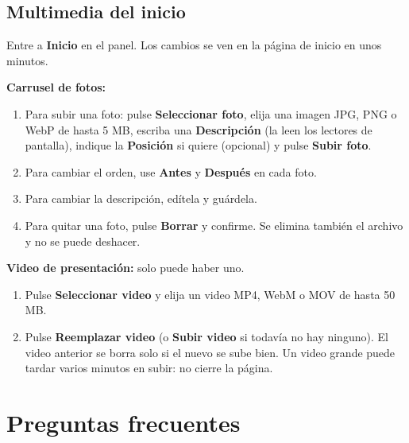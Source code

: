 \documentclass[11pt,a4paper]{article}
\newcommand{\boton}[1]{\textbf{\textcolor{siiisazul}{#1}}}
\begin{document}

\subsection{Multimedia del inicio}
Entre a \boton{Inicio} en el panel. Los cambios se ven en la p\'agina de inicio en unos minutos.

\textbf{Carrusel de fotos:}
\begin{enumerate}
  \item Para subir una foto: pulse \boton{Seleccionar foto}, elija una imagen JPG, PNG o WebP de hasta 5 MB, escriba
    una \textbf{Descripci\'on} (la leen los lectores de pantalla), indique la \textbf{Posici\'on} si quiere (opcional)
    y pulse \boton{Subir foto}.
  \item Para cambiar el orden, use \boton{Antes} y \boton{Despu\'es} en cada foto.
  \item Para cambiar la descripci\'on, ed\'itela y gu\'ardela.
  \item Para quitar una foto, pulse \boton{Borrar} y confirme. Se elimina tambi\'en el archivo y no se puede deshacer.
\end{enumerate}

\textbf{Video de presentaci\'on:} solo puede haber uno.
\begin{enumerate}
  \item Pulse \boton{Seleccionar video} y elija un video MP4, WebM o MOV de hasta 50 MB.
  \item Pulse \boton{Reemplazar video} (o \boton{Subir video} si todav\'ia no hay ninguno). El video anterior se borra
    solo si el nuevo se sube bien. Un video grande puede tardar varios minutos en subir: no cierre la p\'agina.
\end{enumerate}


\section{Preguntas frecuentes}
\end{document}
